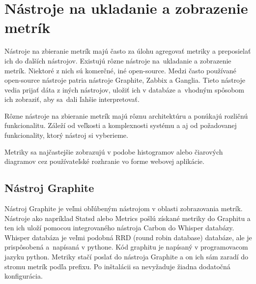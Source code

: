 \documentclass[a4paper, upjsfrontpage, disablespecwarning, thesismargins, thesislinespacing]{rnthesis}
\begin{document}
\newpage


\chapter{Nástroje na ukladanie a zobrazenie metrík}

Nástroje na zbieranie metrík majú často za úlohu agregovať metriky a preposielať ich do ďalších nástrojov.
Existujú rôzne nástroje na~ukladanie a zobrazenie metrík.
Niektoré z nich sú komerčné, iné open-source.
Medzi často používané open-source nástroje patria nástroje Graphite, Zabbix a Ganglia.
Tieto nástroje vedia prijať dáta z iných nástrojov, uložiť ich v databáze a~vhodným spôsobom ich zobraziť, aby sa~dali ľahšie interpretovať.

Rôzne nástroje na zbieranie metrík majú rôznu architektúru a ponúkajú rozličnú funkcionalitu.
Záleží od veľkosti a komplexnosti systému a aj od požadovanej funkcionality, ktorý nástroj si vyberieme.

Metriky sa najčastejšie zobrazujú v podobe histogramov alebo čiarových diagramov cez používateľské rozhranie vo forme webovej aplikácie.


\section{Nástroj Graphite}

Nástroj Graphite je veľmi obľúbeným nástrojom v oblasti zobrazovania metrík.
Nástroje ako napríklad Statsd alebo Metrics pošlú získané metriky do Graphitu a ten ich uloží pomocou integrovaného nástroja Carbon do Whisper databázy. 
Whisper databáza je veľmi podobná RRD (round robin database) databáze, ale je prispôsobená a~napísaná v pythone.
Kód graphitu je napísaný v programovacom jazyku python.
Metriky stačí poslať do nástroja Graphite a on ich sám zaradí do stromu metrík podľa prefixu.
Po inštalácii sa nevyžaduje žiadna dodatočná konfigurácia.
\end{document}

